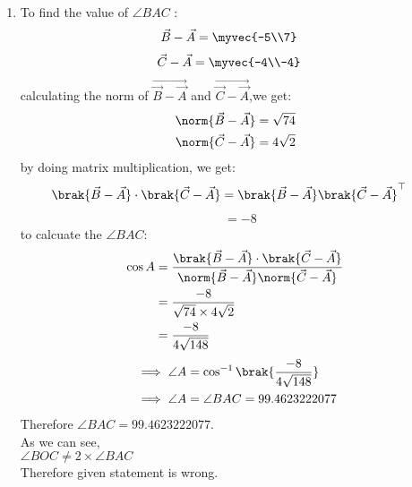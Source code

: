\documentclass[journal,12pt,twocolumn]{IEEEtran}
\theoremstyle{remark}
\begin{document}
\begin{enumerate}
	\item To find  the value of $\angle{BAC}$ :
\begin{align}
\Vec{B}-\Vec{A}
         & =\myvec{-5\\7}
\end{align}
\vspace{0.1cm}
\begin{align}
\Vec{C}-\Vec{A}
          &=\myvec{-4\\-4}
\end{align}
\vspace{0.1cm}
calculating the norm of $\Vec{\Vec{B}-\Vec{A}}$ and $\Vec{\Vec{C}-\Vec{A}}$,we get:
\begin{align}
	\norm{\Vec{B}-\Vec{A}}&= \sqrt{74}\\
	\norm{\Vec{C}-\Vec{A}}&= 4\sqrt{2}
\end{align}
\vspace{0.2cm}
by doing matrix multiplication, we get:
\begin{align}
\brak{\Vec{B}-\Vec{A}}\cdot\brak{\Vec{C}-\Vec{A}}&=\brak{\Vec{B}-\Vec{A}}\brak{\Vec{C}-\Vec{A}}^{\top}\end{align}
\begin{align}
&=-8
\end{align}
\vspace{0.2cm}
to calcuate the $\angle{BAC}$:
\begin{align}
	\cos{A}&=\frac{\brak{\Vec{B}-\Vec{A}}\cdot\brak{\Vec{C}-\Vec{A}}}{\norm{\Vec{B}-\Vec{A}}\norm{\Vec{C}-\Vec{A}}}\\
&=\frac{-8}{\sqrt{74}\times4\sqrt{2}}\\
&=\frac{-8}{4\sqrt{148}}
\end{align}
\vspace{0.1cm}
\begin{align}
&\implies\angle{A}=\cos^{-1}\brak{\frac{-8}{4\sqrt{148}}}\\
&\implies\angle{A}=\angle{BAC}=99.4623222077
\end{align}
\vspace{0.4cm}
Therefore $\angle{BAC}=99.4623222077$.\\
\vspace{0.5cm}
As we can see,\\ $\angle{BOC}\neq2\times\angle{BAC}$\\Therefore given statement is wrong.
\end{enumerate}
\end{document}
